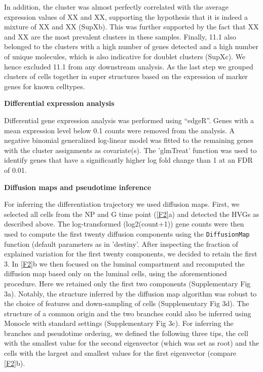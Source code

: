 \documentclass[titlepage, 12pt, oneside]{amsart}
\begin{document}
In addition, the cluster was almost perfectly correlated with the average expression values of XX and XX, supporting the hypothesis that it is indeed a mixture of XX and XX (SupXb).
This was further supported by the fact that XX and XX are the most prevalent clusters in these samples.
Finally, 11.1 also belonged to the clusters with a high number of genes detected and a high number of unique molecules, which is also indicative for doublet clusters (SupXc).
We hence excluded 11.1 from any downstream analysis.
As the last step we grouped clusters of cells together in super structures based on the expression of marker genes for known celltypes.

\textbf{Differential expression analysis }

Differential gene expression analysis was performed using ``edgeR''\autocite{Robinson2010}.
Genes with a mean expression level below 0.1 counts were removed from the analysis.
A negative binomial generalized log-linear model was fitted to the remaining genes with the cluster assignments as covariate(s).
The 'glmTreat' function was used to identify genes that have a significantly higher log fold change than 1 at an FDR of 0.01.

\textbf{Diffusion maps and pseudotime inference}

For inferring the differentiation trajectory we used diffusion maps.
First, we selected all cells from the NP and G time point (\autoref{F2}a) and detected the HVGs as described above.
The log-transformed (log2(count+1)) gene counts were then used to compute the first twenty diffusion components using the \texttt{DiffusionMap} function (default parameters as in 'destiny'\autocite{Angerer2016}.
After inspecting the fraction of explained variation for the first twenty components, we decided to retain the first 3.
In \autoref{F2}b we then focused on the luminal compartment and recomputed the diffusion map based only on the luminal cells, using the aforementioned procedure.
Here we retained only the first two components (Supplementary Fig 3a).
Notably, the structure inferred by the diffusion map algorithm was robust to the choice of features and down-sampling of cells (Supplementary Fig 3d).
The structure of a common origin and the two branches could also be inferred using Monocle with standard settings\autocite{Trapnell2014} (Supplementary Fig 3c).
For inferring the branches and pseudotime ordering, we defined the following three tips, the cell with the smallest value for the second eigenvector (which was set as root) and the cells with the largest and smallest values for the first eigenvector (compare \autoref{F2}b).  
\end{document}
